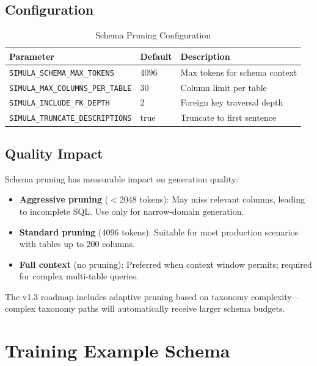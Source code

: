 \subsection{Configuration}

\begin{table}[H]
\centering
\caption{Schema Pruning Configuration}
\label{tab:schema-pruning-config}
\begin{tabular}{lll}
\toprule
\textbf{Parameter} & \textbf{Default} & \textbf{Description} \\
\midrule
\texttt{SIMULA\_SCHEMA\_MAX\_TOKENS} & 4096 & Max tokens for schema context \\
\texttt{SIMULA\_MAX\_COLUMNS\_PER\_TABLE} & 30 & Column limit per table \\
\texttt{SIMULA\_INCLUDE\_FK\_DEPTH} & 2 & Foreign key traversal depth \\
\texttt{SIMULA\_TRUNCATE\_DESCRIPTIONS} & true & Truncate to first sentence \\
\bottomrule
\end{tabular}
\end{table}

\subsection{Quality Impact}

Schema pruning has measurable impact on generation quality:
\begin{itemize}
  \item \textbf{Aggressive pruning} ($<$2048 tokens): May miss relevant columns,
        leading to incomplete SQL. Use only for narrow-domain generation.
  \item \textbf{Standard pruning} (4096 tokens): Suitable for most production
        scenarios with tables up to 200 columns.
  \item \textbf{Full context} (no pruning): Preferred when context window permits;
        required for complex multi-table queries.
\end{itemize}

\noindent
The v1.3 roadmap includes adaptive pruning based on taxonomy complexity---complex
taxonomy paths will automatically receive larger schema budgets.

\section{Training Example Schema}\label{sec:example-schema}

